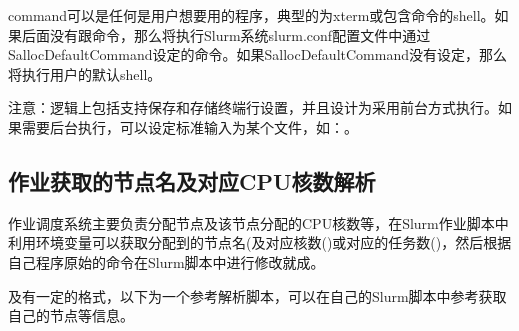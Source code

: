 \documentclass[a4paper,12pt,english]{sphinxmanual}
\begin{document}
\sphinxAtStartPar
{}

\sphinxAtStartPar
command可以是任何是用户想要用的程序，典型的为xterm或包含命令的shell。如果后面没有跟命令，那么将执行Slurm系统slurm.conf配置文件中通过SallocDefaultCommand设定的命令。如果SallocDefaultCommand没有设定，那么将执行用户的默认shell。

\sphinxAtStartPar
注意：逻辑上包括支持保存和存储终端行设置，并且设计为采用前台方式执行。如果需要后台执行，可以设定标准输入为某个文件，如：。


\subsection{作业获取的节点名及对应CPU核数解析}
\label{\detokenize{slurm/slurm:cpu-1}}\label{\detokenize{slurm/slurm:id30}}
\sphinxAtStartPar
作业调度系统主要负责分配节点及该节点分配的CPU核数等，在Slurm作业脚本中利用环境变量可以获取分配到的节点名(及对应核数()或对应的任务数()，然后根据自己程序原始的命令在Slurm脚本中进行修改就成。

\sphinxAtStartPar
{}及有一定的格式，以下为一个参考解析脚本，可以在自己的Slurm脚本中参考获取自己的节点等信息。
\end{document}
